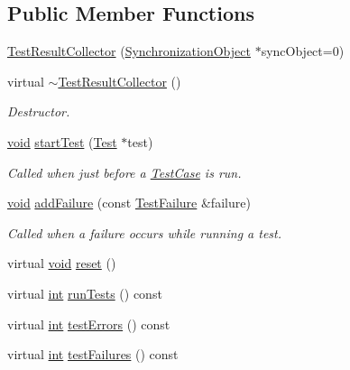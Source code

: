 \subsection*{Public Member Functions}
\begin{DoxyCompactItemize}
\item 
\hyperlink{class_test_result_collector_a8bc475c91000fca9f0ed34e105577767}{Test\-Result\-Collector} (\hyperlink{class_synchronized_object_1_1_synchronization_object}{Synchronization\-Object} $\ast$sync\-Object=0)
\item 
virtual \hyperlink{class_test_result_collector_a2e905ace0bcb819bbe190faf16ea1aed}{$\sim$\-Test\-Result\-Collector} ()
\begin{DoxyCompactList}\small\item\em Destructor. \end{DoxyCompactList}\item 
\hyperlink{wglew_8h_aeea6e3dfae3acf232096f57d2d57f084}{void} \hyperlink{class_test_result_collector_a647d3e05ffc8fcf7023fea2f7c9f95cb}{start\-Test} (\hyperlink{class_test}{Test} $\ast$test)
\begin{DoxyCompactList}\small\item\em Called when just before a \hyperlink{class_test_case}{Test\-Case} is run. \end{DoxyCompactList}\item 
\hyperlink{wglew_8h_aeea6e3dfae3acf232096f57d2d57f084}{void} \hyperlink{class_test_result_collector_af53cbc55621f0eb0dc02d8b0203ea321}{add\-Failure} (const \hyperlink{class_test_failure}{Test\-Failure} \&failure)
\begin{DoxyCompactList}\small\item\em Called when a failure occurs while running a test. \end{DoxyCompactList}\item 
virtual \hyperlink{wglew_8h_aeea6e3dfae3acf232096f57d2d57f084}{void} \hyperlink{class_test_result_collector_a1e20981cc1e127942154a643639d4740}{reset} ()
\item 
virtual \hyperlink{wglew_8h_a500a82aecba06f4550f6849b8099ca21}{int} \hyperlink{class_test_result_collector_ac832652158423deae9c2815ba616e836}{run\-Tests} () const 
\item 
virtual \hyperlink{wglew_8h_a500a82aecba06f4550f6849b8099ca21}{int} \hyperlink{class_test_result_collector_a0dc4aa03e6b22907cd44cf30a9ea0af3}{test\-Errors} () const 
\item 
virtual \hyperlink{wglew_8h_a500a82aecba06f4550f6849b8099ca21}{int} \hyperlink{class_test_result_collector_a583a62791337a71725a719f57dc654e2}{test\-Failures} () const 

\end{DoxyCompactItemize}
